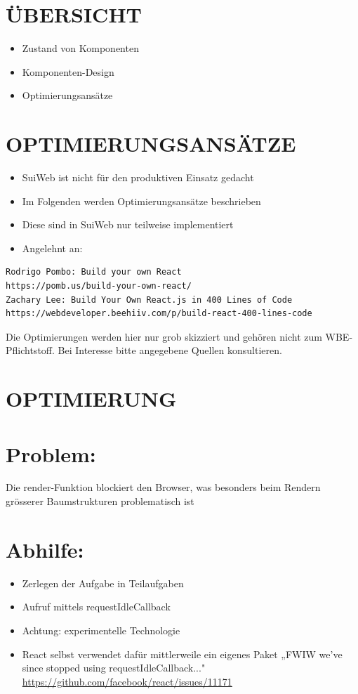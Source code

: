 \documentclass[10pt]{article}
\begin{document}
\section*{ÜBERSICHT}
\begin{itemize}
  \item Zustand von Komponenten
  \item Komponenten-Design
  \item Optimierungsansätze
\end{itemize}

\section*{OPTIMIERUNGSANSÄTZE}
\begin{itemize}
  \item SuiWeb ist nicht für den produktiven Einsatz gedacht
  \item Im Folgenden werden Optimierungsansätze beschrieben
  \item Diese sind in SuiWeb nur teilweise implementiert
  \item Angelehnt an:
\end{itemize}

\begin{verbatim}
Rodrigo Pombo: Build your own React
https://pomb.us/build-your-own-react/
Zachary Lee: Build Your Own React.js in 400 Lines of Code
https://webdeveloper.beehiiv.com/p/build-react-400-lines-code
\end{verbatim}

Die Optimierungen werden hier nur grob skizziert und gehören nicht zum WBE-Pflichtstoff. Bei Interesse bitte angegebene Quellen konsultieren.

\section*{OPTIMIERUNG}
\section*{Problem:}
Die render-Funktion blockiert den Browser, was besonders beim Rendern grösserer Baumstrukturen problematisch ist

\section*{Abhilfe:}
\begin{itemize}
  \item Zerlegen der Aufgabe in Teilaufgaben
  \item Aufruf mittels requestIdleCallback
  \item Achtung: experimentelle Technologie
  \item React selbst verwendet dafür mittlerweile ein eigenes Paket „FWIW we've since stopped using requestIdleCallback..." \href{https://github.com/facebook/react/issues/11171}{https://github.com/facebook/react/issues/11171}
\end{itemize}
\end{document}
